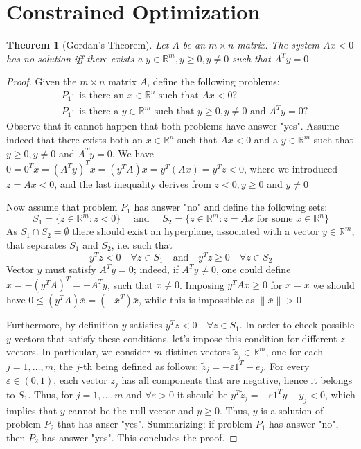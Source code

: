\documentclass{book}
\newcommand{\R}{\mathbb{R}}
\theoremstyle{theoremv2}
\newtheorem{theorem}{Theorem}[chapter]
\theoremstyle{defv2}
\theoremstyle{remark}
\theoremstyle{remark}
\begin{document}
\section{Constrained Optimization}
\begin{theorem}[Gordan's Theorem]
    \label{Gordan}
    Let $A$ be an $m\times n$ matrix. The system $Ax<0$ has no solution iff there exists a $y\in\R^m,y\geq0,y\neq0$ such that $A^Ty=0$ 
\end{theorem}
\begin{proof}[Proof]
    Given the $m \times n$ matrix $A$, define the following problems: 
   \begin{align*}
       &P_1: \text{ is there an } x\in\R^n \text{ such that } Ax<0?\\
       &P_1: \text{ is there a } y\in\R^m \text{ such that } y\geq0,y\neq0 \text{ and } A^Ty=0?
   \end{align*} 
    Observe that it cannot happen that both problems have answer "yes". Assume indeed that there exists both an $x\in\R^n$ such that $Ax<0$ and a $y\in\R^m$ such that $y\geq0,y\neq0$ and $A^Ty=0$. We have $0=0^Tx=(A^Ty)^Tx=(y^TA)x=y^T(Ax)=y^Tz<0$, where we introduced $z=Ax<0$, and the last inequality derives from $z<0,y\geq0$ and $y\neq0$

    Now assume that problem $P_1$ has answer "no" and define the following sets: 
    \[
        S_1 = \{ z\in\R^m:z<0 \} \quad \text{ and } \quad S_2 = \{ z\in\R^m:z=Ax \text{ for some } x\in\R^n \}
    \]
    As $S_1 \cap S_2= \emptyset$ there should exist an hyperplane, associated with a vector $y\in\R^m$, that separates $S_1$ and $S_2$, i.e. such that 
    \[
        y^Tz <0 \quad \forall z\in S_1 \quad \text{and} \quad y^Tz\geq 0 \quad \forall z\in S_2
    \]
    Vector $y$ must satisfy $A^Ty=0$; indeed, if $A^Ty\neq0$, one could define $\bar{x}=-(y^TA)^T=-A^Ty$, such that $\bar{x}\neq0$. Imposing $y^TAx\geq0$ for $x=\bar{x}$ we should have $0\leq(y^TA)\bar{x}=(-\bar{x}^T)\bar{x}$, while this is impossible as $\|\bar{x}\|>0$

    Furthermore, by definition $y$ satisfies $y^Tz<0 \quad \forall z\in S_1$. In order to check possible $y$ vectors that satisfy these conditions, let's impose this condition for different $z$ vectors. In particular, we consider $m$ distinct vectors $\tilde{z}_j\in\R^m$, one for each $j=1,\dots,m$, the $j$-th being defined as follows: $\tilde{z}_j = -\varepsilon1^T-e_j$. For every $\varepsilon\in(0,1)$, each vector $z_j$ has all components that are negative, hence it belongs to $S_1$. Thus, for $j=1,\dots,m$ and $\forall \varepsilon>0$ it should be $y^T\tilde{z}_j = -\varepsilon1^Ty-y_j<0$, which implies that $y$ cannot be the null vector and $y\geq 0$. Thus, $y$ is a solution of problem $P_2$ that has anser "yes". 
    Summarizing: if problem $P_1$ has answer "no", then $P_2$ has answer "yes". This concludes the proof.
\end{proof}
\end{document}
